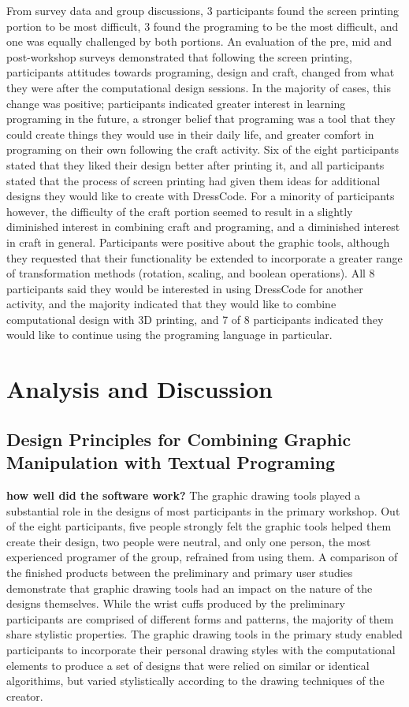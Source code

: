 \documentclass{sigchi}
\begin{document}
From survey data and group discussions, 3 participants found the screen printing portion to be most difficult, 3 found the programing to be the most difficult, and one was equally challenged by both portions. An evaluation of the pre, mid and post-workshop surveys demonstrated that following the screen printing, participants attitudes towards programing, design and craft, changed from what they were after the computational design sessions. In the majority of cases, this change was positive; participants indicated greater interest in learning programing in the future, a stronger belief that programing was a tool that they could create things they would use in their daily life, and greater comfort in programing on their own following the craft activity. Six of the eight participants stated that they liked their design better after printing it, and all participants stated that the process of screen printing had given them ideas for additional designs they would like to create with DressCode. For a minority of participants however, the difficulty of the craft portion seemed to result in a slightly diminished interest in combining craft and programing, and a diminished interest in craft in general. Participants were positive about the graphic tools, although they requested that their functionality be extended to incorporate a greater range of transformation methods (rotation, scaling, and boolean operations). All 8 participants said they would be interested in using DressCode for another activity, and the majority indicated that they would like to combine computational design with 3D printing, and 7 of 8 participants indicated they would like to continue using the programing language in particular.

\section{Analysis and Discussion}

\subsection{Design Principles for Combining Graphic Manipulation with Textual Programing}
\textbf{how well did the software work?}
The graphic drawing tools played a substantial role in the designs of most participants in the primary workshop. Out of the eight participants, five people strongly felt the graphic tools helped them create their design, two people were neutral, and only one person, the most experienced programer of the group, refrained from using them. A comparison of the finished products between the preliminary and primary user studies demonstrate that graphic drawing tools had an impact on the nature of the designs themselves. While the wrist cuffs produced by the preliminary participants are comprised of different forms and patterns, the majority of them share stylistic properties. The graphic drawing tools in the primary study enabled participants to incorporate their personal drawing styles with the computational elements to produce a set of designs that were relied on similar or identical algorithims, but varied stylistically according to the drawing techniques of the creator. 
\end{document}
